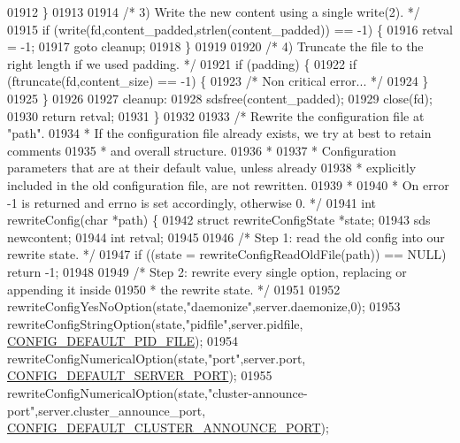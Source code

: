 \begin{DoxyCode}
{{{{{{{{{{{{{{{{{{{{{{{{{{{{01912     \}
01913 
01914     \textcolor{comment}{/* 3) Write the new content using a single write(2). */}
01915     \textcolor{keywordflow}{if} (write(fd,content\_padded,strlen(content\_padded)) == -1) \{
01916         retval = -1;
01917         \textcolor{keywordflow}{goto} cleanup;
01918     \}
01919 
01920     \textcolor{comment}{/* 4) Truncate the file to the right length if we used padding. */}
01921     \textcolor{keywordflow}{if} (padding) \{
01922         \textcolor{keywordflow}{if} (ftruncate(fd,content\_size) == -1) \{
01923             \textcolor{comment}{/* Non critical error... */}
01924         \}
01925     \}
01926 
01927 cleanup:
01928     sdsfree(content\_padded);
01929     close(fd);
01930     \textcolor{keywordflow}{return} retval;
01931 \}
01932 
01933 \textcolor{comment}{/* Rewrite the configuration file at "path".}
01934 \textcolor{comment}{ * If the configuration file already exists, we try at best to retain comments}
01935 \textcolor{comment}{ * and overall structure.}
01936 \textcolor{comment}{ *}
01937 \textcolor{comment}{ * Configuration parameters that are at their default value, unless already}
01938 \textcolor{comment}{ * explicitly included in the old configuration file, are not rewritten.}
01939 \textcolor{comment}{ *}
01940 \textcolor{comment}{ * On error -1 is returned and errno is set accordingly, otherwise 0. */}
01941 \textcolor{keywordtype}{int} rewriteConfig(\textcolor{keywordtype}{char} *path) \{
01942     \textcolor{keyword}{struct} rewriteConfigState *state;
01943     sds newcontent;
01944     \textcolor{keywordtype}{int} retval;
01945 
01946     \textcolor{comment}{/* Step 1: read the old config into our rewrite state. */}
01947     \textcolor{keywordflow}{if} ((state = rewriteConfigReadOldFile(path)) == NULL) \textcolor{keywordflow}{return} -1;
01948 
01949     \textcolor{comment}{/* Step 2: rewrite every single option, replacing or appending it inside}
01950 \textcolor{comment}{     * the rewrite state. */}
01951 
01952     rewriteConfigYesNoOption(state,\textcolor{stringliteral}{"daemonize"},server.daemonize,0);
01953     rewriteConfigStringOption(state,\textcolor{stringliteral}{"pidfile"},server.pidfile,
      \hyperlink{server_8h_ad0a549a4ce81a4436199706f3513bbc2}{CONFIG\_DEFAULT\_PID\_FILE});
01954     rewriteConfigNumericalOption(state,\textcolor{stringliteral}{"port"},server.port,
      \hyperlink{server_8h_afc9f3396e2da1194ef2ccc6ab97d4e3d}{CONFIG\_DEFAULT\_SERVER\_PORT});
01955     rewriteConfigNumericalOption(state,\textcolor{stringliteral}{"cluster-announce-port"},server.cluster\_announce\_port,
      \hyperlink{server_8h_ac55c8423c202c1f0b4e786eb70adefb3}{CONFIG\_DEFAULT\_CLUSTER\_ANNOUNCE\_PORT});
}}}}}}}}}}}}}}}}}}}}}}}}}}}}
\end{DoxyCode}
